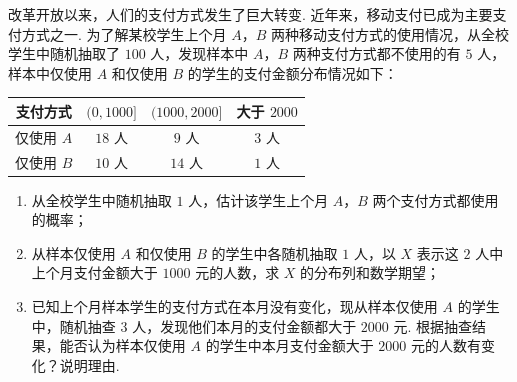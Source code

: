 \begin{problem}
改革开放以来，人们的支付方式发生了巨大转变. 近年来，移动支付已成为主要支付方式之一. 为了解某校学生上个月 \(A\)，\(B\) 两种移动支付方式的使用情况，从全校学生中随机抽取了 \(100\) 人，发现样本中 \(A\)，\(B\) 两种支付方式都不使用的有 \(5\) 人，样本中仅使用 \(A\) 和仅使用 \(B\) 的学生的支付金额分布情况如下：

\begin{center}
\begin{tabular}{c|ccc}
支付方式 & \((0,1000]\) & \((1000,2000]\) & 大于 \(2000\) \\
\hline
仅使用 \(A\) & \(18\) 人 & \(9\) 人 & \(3\) 人 \\
仅使用 \(B\) & \(10\) 人 & \(14\) 人 & \(1\) 人
\end{tabular}
\end{center}

\begin{enumerate}
\item 从全校学生中随机抽取 \(1\) 人，估计该学生上个月 \(A\)，\(B\) 两个支付方式都使用的概率；

\item 从样本仅使用 \(A\) 和仅使用 \(B\) 的学生中各随机抽取 \(1\) 人，以 \(X\) 表示这 \(2\) 人中上个月支付金额大于 \(1000\) 元的人数，求 \(X\) 的分布列和数学期望；

\item 已知上个月样本学生的支付方式在本月没有变化，现从样本仅使用 \(A\) 的学生中，随机抽查 \(3\) 人，发现他们本月的支付金额都大于 \(2000\) 元. 根据抽查结果，能否认为样本仅使用 \(A\) 的学生中本月支付金额大于 \(2000\) 元的人数有变化？说明理由.
\end{enumerate}
\end{problem}

